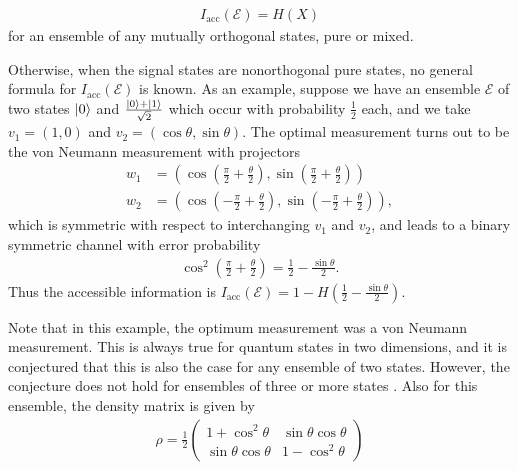 \documentclass[a4paper, 12pt]{article}
\numberwithin{equation}{section}
\numberwithin{figure}{section}
\theoremstyle{definition}
\begin{document}
    \begin{align}
        I_\text{acc}(\mathcal{E}) = H(X)
    \end{align}
    for an ensemble of any mutually orthogonal states, pure or mixed. \par
    Otherwise, when the signal states are nonorthogonal pure states, no general formula for $I_\text{acc}(\mathcal{E})$ is known. As an example, suppose we have an ensemble $\mathcal{E}$ of two states $\ket{0}$ and $\frac{\ket{0} + \ket{1}}{\sqrt{2}}$ which occur with probability $\frac{1}{2}$ each, and we take $v_1 = (1, 0)$ and $v_2 = (\cos \theta, \sin \theta)$. The optimal measurement turns out to be the von Neumann measurement with projectors
    \begin{align}
        w_1 &= \left( \cos \left( \frac{\pi}{2} + \frac{\theta}{2} \right), \sin \left( \frac{\pi}{2} + \frac{\theta}{2} \right) \right) \\
        w_2 &= \left( \cos \left( -\frac{\pi}{2} + \frac{\theta}{2} \right), \sin \left( -\frac{\pi}{2} + \frac{\theta}{2} \right) \right),
    \end{align}
    which is symmetric with respect to interchanging $v_1$ and $v_2$, and leads to a binary symmetric channel with error probability
    \begin{align}
        \cos^2 \left( \frac{\pi}{2} + \frac{\theta}{2} \right) = \frac{1}{2} - \frac{\sin \theta}{2}.
    \end{align}
    Thus the accessible information is $I_{\text{acc}}(\mathcal{E}) = 1 - H \left( \frac{1}{2} - \frac{\sin \theta}{2} \right)$. \par
    Note that in this example, the optimum measurement was a von Neumann measurement. This is always true for quantum states in two dimensions, and it is conjectured that this is also the case for any ensemble of two states. However, the conjecture does not hold for ensembles of three or more states \cite{shor}.
    Also for this ensemble, the density matrix is given by
    \begin{align}
        \rho = \frac{1}{2} \left( \begin{array}{cc}
            1 + \cos^2\theta & \sin\theta \cos\theta \\
            \sin\theta \cos\theta & 1 - \cos^2\theta
        \end{array} \right)
    \end{align}
\end{document}
